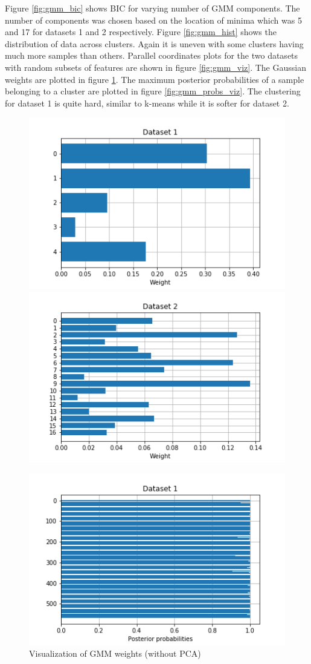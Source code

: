 \documentclass[letterpaper]{article}
\begin{document}
	Figure \ref{fig:gmm_bic} shows BIC for varying number of GMM components. The number of components was chosen based on the location of minima which was 5 and 17 for datasets 1 and 2 respectively. Figure \ref{fig:gmm_hist} shows the distribution of data across clusters. Again it is uneven with some clusters having much more samples than others. Parallel coordinates plots for the two datasets with random subsets of features are shown in figure \ref{fig:gmm_viz}. The Gaussian weights are plotted in figure \ref{fig:gmm_wts_viz}. The maximum posterior probabilities of a sample belonging to a cluster are plotted in figure \ref{fig:gmm_probs_viz}. The clustering for dataset 1 is quite hard, similar to k-means while it is softer for dataset 2.

	\begin{figure}
		\centering
		\begin{minipage}{.48\textwidth}
			\centering
			\includegraphics[width=.5\linewidth]{../../plots/gmm_wts_1}%
			\centering
			\includegraphics[width=.5\linewidth]{../../plots/gmm_wts_2}
			\caption{Visualization of GMM weights (without PCA)}
			\label{fig:gmm_wts_viz}
		\end{minipage}%
		\hfill
		\begin{minipage}{.48\textwidth}
			\centering
			\includegraphics[width=.5\linewidth]{../../plots/gmm_probs_1}%

\end{minipage}
\end{figure}
\end{document}
